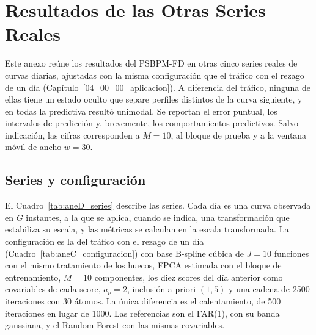 \chapter{Resultados de las Otras Series Reales}
\label{aneD_00_00_otras_series}


Este anexo reúne los resultados del PSBPM-FD en otras cinco series reales de curvas diarias, ajustadas con la misma configuración que el tráfico con el rezago de un día (Capítulo~\ref{04_00_00_aplicacion}). A diferencia del tráfico, ninguna de ellas tiene un estado oculto que separe perfiles distintos de la curva siguiente, y en todas la predictiva resultó unimodal. Se reportan el error puntual, los intervalos de predicción y, brevemente, los comportamientos predictivos. Salvo indicación, las cifras corresponden a $M = 10$, al bloque de prueba y a la ventana móvil de ancho $w = 30$.

\section{Series y configuración}
\label{aneD_00_01_series}

El Cuadro~\ref{tab:aneD_series} describe las series. Cada día es una curva observada en $G$ instantes, a la que se aplica, cuando se indica, una transformación que estabiliza su escala, y las métricas se calculan en la escala transformada. La configuración es la del tráfico con el rezago de un día (Cuadro~\ref{tab:aneC_configuracion}) con base B-spline cúbica de $J = 10$ funciones con el mismo tratamiento de los huecos, FPCA estimada con el bloque de entrenamiento, $M = 10$ componentes, los diez scores del día anterior como covariables de cada score, $a_\nu = 2$, inclusión a priori $(1, 5)$ y una cadena de 2500 iteraciones con 30 átomos. La única diferencia es el calentamiento, de 500 iteraciones en lugar de 1000. Las referencias son el FAR(1), con su banda gaussiana, y el Random Forest con las mismas covariables.

